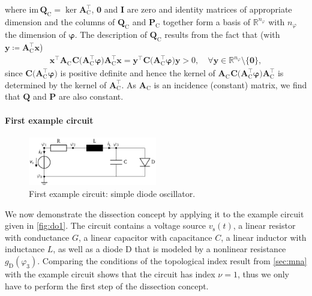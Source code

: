 \documentclass[AMA,STIX1COL]{WileyNJD-v2}
\newcommand{\mb}[1]{\mathbf{#1}}
\newcommand{\mr}[1]{\mathrm{#1}}
\newcommand{\T}{{\!\top}}
\newcommand{\A}[1]{\mb{A}_\mr{#1}}
\newcommand{\AT}[1]{\mb{A}_\mr{#1}^{\T}}
\newcommand{\vphi}{\boldsymbol{\varphi}}
\begin{document}
where $\mr{im\, } \mb{Q}_\mr{C} = \ker \AT{C}$, $\mb{0}$ and $\mb{I}$ are zero and identity matrices of appropriate dimension and the columns of $\mb{Q}_\mr{C}$ and $\mb{P}_\mr{C}$ together form a basis of $\mathbb{R}^{n_\varphi}$ with $n_\varphi$ the dimension of $\vphi$. The description of $\mb{Q}_\mr{C}$ results from the fact that (with $\mb{y} \coloneqq \AT{C} \mb{x}$)
\begin{align*}
    \mb{x}^{\T} \A{C}^{\phantom{\T}} \mb{C} \big( \AT{C} \vphi \big) \AT{C} \mb{x} = \mb{y}^{\T} \mb{C} \big( \AT{C} \vphi \big) \mb{y} > 0, \quad \forall \mb{y} \in \mathbb{R}^{n_\varphi} \setminus \{ \mb{0} \},
\end{align*}
since $\mb{C} \big( \AT{C} \vphi \big)$ is positive definite and hence the kernel of $\A{C}^{\phantom{\T}} \mb{C} \big( \AT{C} \vphi \big) \AT{C}$ is determined by the kernel of $\AT{C}$. As $\A{C}$ is an incidence (constant) matrix, we find that $\mb{Q}$ and $\mb{P}$ are also constant.

\paragraph{First example circuit}
\begin{figure}
    \begin{center}
        \includegraphics[width=0.5\textwidth]{do1}
    \end{center}
    \caption{First example circuit: simple diode oscillator.}
    \label{fig:do1}
\end{figure}
We now demonstrate the dissection concept by applying it to the example circuit given in \autoref{fig:do1}. The circuit contains a voltage source $v_\mathrm{s}(t)$, a linear resistor with conductance $G$, a linear capacitor with capacitance $C$, a linear inductor with inductance $L$, as well as a diode $\mathrm{D}$ that is modeled by a nonlinear resistance $g_\mathrm{D}(\varphi_3)$. Comparing the conditions of the topological index result from \autoref{sec:mna} with the example circuit shows that the circuit has index $\nu = 1$, thus we only have to perform the first step of the dissection concept.
\end{document}
